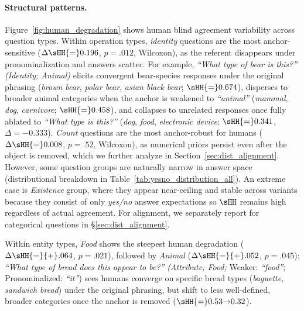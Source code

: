 \paragraph{Structural patterns.}
Figure~\ref{fig:human_degradation} shows human blind agreement variability across question types.
Within operation types, \textit{identity} questions are the most anchor-sensitive ($\Delta\sHH{=}0.196$, $p{=}.012$, Wilcoxon), as the referent disappears under pronominalization and answers scatter. %
For example, \textit{``What type of bear is this?''} \emph{(Identity; Animal)} elicits convergent bear-species responses under the original phrasing (\textit{brown bear}, \textit{polar bear}, \textit{asian black bear}; $\sHH{=}0.674$), disperses to broader animal categories when the anchor is weakened to \textit{``animal''} (\textit{mammal}, \textit{dog}, \textit{carnivore}; $\sHH{=}0.458$), and collapses to unrelated responses once fully ablated to \textit{``What type is this?''} (\textit{dog}, \textit{food}, \textit{electronic device}; $\sHH{=}0.341$, $\Delta{=}{-}0.333$).
\textit{Count} questions are the most anchor-robust for humans ($\Delta\sHH{=}0.008$, $p{=}.52$, Wilcoxon), as numerical priors persist even after the object is removed, which we further analyze in Section~\ref{sec:dist_alignment}. %
However, some question groups are naturally narrow in answer space (distributional breakdown in Table~\ref{tab:yesno_distribution_all}). An extreme case is \textit{Existence} group, where they appear near-ceiling and stable across variants because they consist of only \textit{yes/no} answer expectations so $\sHH$ remains high regardless of actual agreement. %
For alignment, we separately report for categorical questions in \S\ref{sec:dist_alignment}. %

Within entity types, \textit{Food} shows the steepest human degradation ($\Delta\sHH{=}{+}.064$, $p{=}.021$), followed by \textit{Animal} ($\Delta\sHH{=}{+}.052$, $p{=}.045$):
\textit{``What type of bread does this appear to be?''} \emph{(Attribute; Food;} Weaker: \textit{``food''};
Pronominalized: \textit{``it''}) sees humans converge on specific bread types
(\textit{baguette}, \textit{sandwich bread}) under the original phrasing, but shift
to less well-defined, broader categories once the anchor is removed ($\sHH{=}0.53{\to}0.32$).

